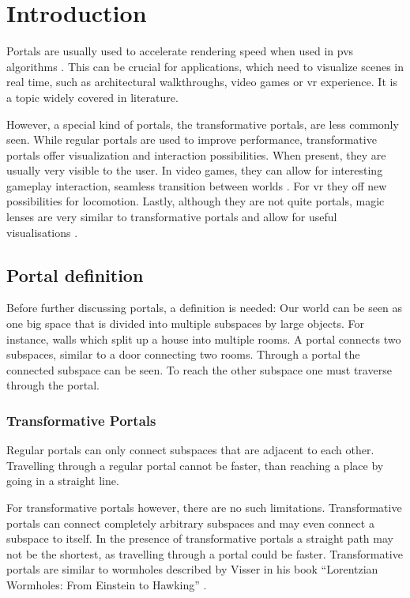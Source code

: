 
\chapter{Introduction}

Portals are usually used to accelerate rendering speed when used in \gls{pvs} algorithms \cite{luebke:1995:portals}. This can be crucial for applications, which need to visualize scenes in real time, such as architectural walkthroughs, video games or \gls{vr} experience. It is a topic widely covered in literature.

However, a special kind of portals, the transformative portals, are less commonly seen. While regular portals are used to improve performance, transformative portals offer visualization and interaction possibilities. When present, they are usually very visible to the user. In video games, they can allow for interesting gameplay interaction, seamless transition between worlds \cite{schmalstieg:1999:sewing}. For \gls{vr} they off new possibilities for locomotion. Lastly, although they are not quite portals, magic lenses are very similar to transformative portals and allow for useful visualisations \cite{viega:1996:3d}.

\section{Portal definition}
Before further discussing portals, a definition is needed: Our world can be seen as one big space that is divided into multiple subspaces by large objects. For instance, walls which split up a house into multiple rooms. A portal connects two subspaces, similar to a door connecting two rooms. Through a portal the connected subspace can be seen. To reach the other subspace one must traverse through the portal.

\subsection{Transformative Portals}
Regular portals can only connect subspaces that are adjacent to each other. Travelling through a regular portal cannot be faster, than reaching a place by going in a straight line.

For transformative portals however, there are no such limitations. Transformative portals can connect completely arbitrary subspaces and may even connect a subspace to itself. In the presence of transformative portals a straight path may not be the shortest, as travelling through a portal could be faster. Transformative portals are similar to wormholes described by Visser  in his book \enquote{Lorentzian Wormholes: From Einstein to Hawking} \cite{Visser:Wormholes}.

